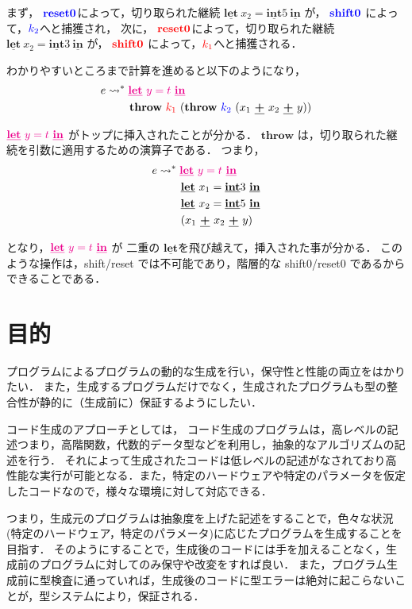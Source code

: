 \documentclass[T]{compsoft}
\newcommand\too{\leadsto^*}
\newcommand\red[1]{\textcolor{red}{#1}}
\newcommand\magenta[1]{\textcolor{magenta}{#1}}
\newcommand\blue[1]{\textcolor{blue}{#1}}
\newcommand\Resetz{\textbf{reset0}}
\newcommand\Shiftz{\textbf{shift0}}
\newcommand\Throw{\textbf{throw}}
\newcommand\cPlus{\underline{\textbf{+}}}
\newcommand\cLet{\underline{\textbf{let}}}
\newcommand\cIn{\underline{\textbf{in}}}
\newcommand\cint{\underline{\textbf{int}}}
\theoremstyle{break}
\begin{document}
まず，
$\blue{\Resetz}$によって，切り取られた継続 $\cLet~x_2=\cint{5}~\cIn$ が，
$\blue{\Shiftz}$ によって，$\blue{k_2}$へと捕獲され，
次に，
$\red{\Resetz}$によって，切り取られた継続 $\cLet~x_2=\cint{3}~\cIn$ が，
$\red{\Shiftz}$ によって，$\red{k_1}$へと捕獲される．

わかりやすいところまで計算を進めると以下のようになり，
\begin{align*}
  e & \too \magenta{\cLet~y=t~\cIn} \\
    & \phantom{\too}~~ \Throw~\red{k_1}~(\Throw~\blue{k_2}~(x_1~\cPlus~x_2~\cPlus~y))
\end{align*}

$\magenta{\cLet~y=t~\cIn}$ がトップに挿入されたことが分かる．
$\Throw$ は，切り取られた継続を引数に適用するための演算子である．
つまり，
\begin{align*}
  e & \too \magenta{\cLet~y=t~\cIn} \\
    & \phantom{\too}~~ \cLet~x_1=\cint{3}~\cIn \\
    & \phantom{\too}~~ \cLet~x_2=\cint{5}~\cIn \\
    & \phantom{\too}~~ (x_1~\cPlus~x_2~\cPlus~y)
\end{align*}

となり，$\magenta{\cLet~y=t~\cIn}$ が 二重の $\cLet$を飛び越えて，挿入された事が分かる．
このような操作は，shift/reset では不可能であり，階層的な shift0/reset0 であるからできることである．

\section{目的}
プログラムによるプログラムの動的な生成を行い，保守性と性能の両立をはかりたい．
また，生成するプログラムだけでなく，生成されたプログラムも型の整合性が静的に（生成前に）保証するようにしたい．

コード生成のアプローチとしては，
コード生成のプログラムは，高レベルの記述つまり，高階関数，代数的データ型などを利用し，抽象的なアルゴリズムの記述を行う．
それによって生成されたコードは低レベルの記述がなされており高性能な実行が可能となる．また，特定のハードウェアや特定のパラメータを仮定したコードなので，様々な環境に対して対応できる．

つまり，生成元のプログラムは抽象度を上げた記述をすることで，色々な状況(特定のハードウェア，特定のパラメータ)に応じたプログラムを生成することを目指す．
そのようにすることで，生成後のコードには手を加えることなく，生成前のプログラムに対してのみ保守や改変をすれば良い．
また，プログラム生成前に型検査に通っていれば，生成後のコードに型エラーは絶対に起こらないことが，型システムにより，保証される．
\end{document}
